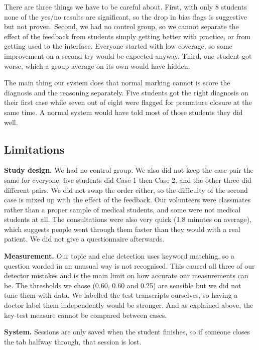 \documentclass[conference]{IEEEtran}
\begin{document}
There are three things we have to be careful about. First, with only 8 students
none of the yes/no results are significant, so the drop in bias flags is
suggestive but not proven. Second, we had no control group, so we cannot separate
the effect of the feedback from students simply getting better with practice, or
from getting used to the interface. Everyone started with low coverage, so some
improvement on a second try would be expected anyway. Third, one student got
worse, which a group average on its own would have hidden.

The main thing our system does that normal marking cannot is score the diagnosis
and the reasoning separately. Five students got the right diagnosis on their
first case while seven out of eight were flagged for premature closure at the
same time. A normal system would have told most of those students they did well.

\subsection{Limitations}
\label{sec:limitations}
\textbf{Study design.} We had no control group. We also did not keep the case
pair the same for everyone: five students did Case 1 then Case 2, and the other
three did different pairs. We did not swap the order either, so the difficulty of
the second case is mixed up with the effect of the feedback. Our volunteers were
classmates rather than a proper sample of medical students, and some were not
medical students at all. The consultations were also very quick (1.8 minutes on
average), which suggests people went through them faster than they would with a
real patient. We did not give a questionnaire afterwards.

\textbf{Measurement.} Our topic and clue detection uses keyword matching, so a
question worded in an unusual way is not recognised. This caused all three of our
detector mistakes and is the main limit on how accurate our measurements can be.
The thresholds we chose (0.60, 0.60 and 0.25) are sensible but we did not tune
them with data. We labelled the test transcripts ourselves, so having a doctor
label them independently would be stronger. And as explained above, the key-test
measure cannot be compared between cases.

\textbf{System.} Sessions are only saved when the student finishes, so if
someone closes the tab halfway through, that session is lost.

\end{document}
